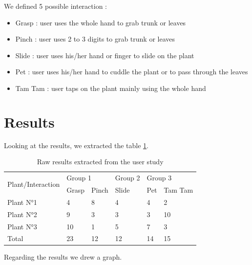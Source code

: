 We defined 5 possible interaction :

\begin{itemize}
    \item Grasp : user uses the whole hand to grab trunk or leaves
    \item Pinch : user uses 2 to 3 digits to grab trunk or leaves
    \item Slide : user uses his/her hand or finger to slide on the plant
    \item Pet : user uses his/her hand to cuddle the plant or to pass through the leaves
    \item Tam Tam : user taps on the plant mainly using the whole hand
\end{itemize}


\section{Results}
Looking at the results, we extracted the table \ref{tab:results}.


\begin{table}[ht]
\begin{tabular}{|l|ll|l|ll|}
\hline
\multirow{2}{*}{Plant/Interaction} & \multicolumn{2}{l|}{Group 1}       & Group 2 & \multicolumn{2}{l|}{Group 3}       \\ \cline{2-6} 
                                   & \multicolumn{1}{l|}{Grasp} & Pinch & Slide   & \multicolumn{1}{l|}{Pet} & Tam Tam \\ \hline
Plant N°1                          & \multicolumn{1}{l|}{4}     & 8     & 4       & \multicolumn{1}{l|}{4}   & 2       \\ \hline
Plant N°2                          & \multicolumn{1}{l|}{9}     & 3     & 3       & \multicolumn{1}{l|}{3}   & 10      \\ \hline
Plant N°3                          & \multicolumn{1}{l|}{10}    & 1     & 5       & \multicolumn{1}{l|}{7}   & 3       \\ \hline
Total                              & \multicolumn{1}{l|}{23}    & 12    & 12      & \multicolumn{1}{l|}{14}  & 15      \\ \hline
\end{tabular}
\caption{Raw results extracted from the user study}
\label{tab:results}
\end{table}

\newpage

Regarding the results we drew a graph.


